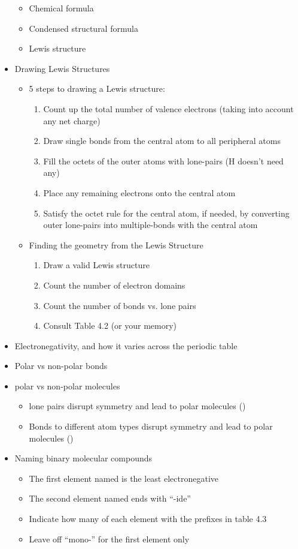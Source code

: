 \documentclass[12pt, letterpaper]{memoir}
\begin{document}
\begin{itemize}
		\begin{itemize}
			\item Chemical formula
			\item Condensed structural formula
			\item Lewis structure
		\end{itemize}
		\item Drawing Lewis Structures
		\begin{itemize}
			\item 5 steps to drawing a Lewis structure:
			\begin{enumerate}
				\item Count up the total number of valence electrons (taking into account any net charge)
				\item Draw single bonds from the central atom to all peripheral atoms
				\item Fill the octets of the outer atoms with lone-pairs (H doesn't need any)
				\item Place any remaining electrons onto the central atom
				\item Satisfy the octet rule for the central atom, if needed, by converting outer lone-pairs into multiple-bonds with the central atom
			\end{enumerate}
			\item Finding the geometry from the Lewis Structure
			\begin{enumerate}
				\item Draw a valid Lewis structure
				\item Count the number of electron domains
				\item Count the number of bonds vs. lone pairs
				\item Consult Table 4.2 (or your memory)
			\end{enumerate}
		\end{itemize}
		\item Electronegativity, and how it varies across the periodic table
		\item Polar vs non-polar bonds
		\item polar vs non-polar molecules
		\begin{itemize}
			\item lone pairs disrupt symmetry and lead to polar molecules ()
			\item Bonds to different atom types disrupt symmetry and lead to polar molecules ()
		\end{itemize}
		\item Naming binary molecular compounds
		\begin{itemize}
			\item The first element named is the least electronegative
			\item The second element named ends with ``-ide''
			\item Indicate how many of each element with the prefixes in table 4.3
			\item Leave off ``mono-'' for the first element only
		\end{itemize}
	\end{itemize}

	
\end{document}
